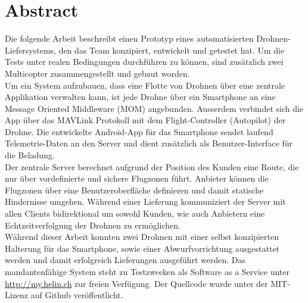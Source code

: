 \newpage
{}
\chapter*{Abstract}

Die folgende Arbeit beschreibt einen Prototyp eines automatisierten Drohnen-Liefersystems, den das Team konzipiert, entwickelt und getestet hat. Um die Tests unter realen Bedingungen durchführen zu können, sind zusätzlich zwei Multicopter zusammengestellt und gebaut worden.\\

Um ein System aufzubauen, dass eine Flotte von Drohnen über eine zentrale Applikation verwalten kann, ist jede Drohne über ein Smartphone an eine Message Oriented Middleware (\Gls{MOM}) angebunden. Ausserdem verbindet sich die App über das \Gls{MAVLink} Protokoll mit dem \Gls{Flight-Controller} (Autopilot) der Drohne. 
Die entwickelte Android-App für das Smartphone sendet laufend Telemetrie-Daten an den Server und dient zusätzlich als Benutzer-Interface für die Beladung. \\

Der zentrale Server berechnet aufgrund der Position des Kunden eine Route, die nur über vordefinierte und sichere Flugzonen führt. Anbieter können die Flugzonen über eine Benutzeroberfläche definieren und damit statische Hindernisse umgehen. Während einer Lieferung kommuniziert der Server mit allen Clients bidirektional um sowohl Kunden, wie auch Anbietern eine Echtzeitverfolgung der Drohnen zu ermöglichen. \\

Während dieser Arbeit konnten zwei Drohnen mit einer selbst konzipierten Halterung für das Smartphone, sowie einer Abwurfvorrichtung ausgestattet werden und damit erfolgreich Lieferungen ausgeführt werden. Das mandantenfähige System steht zu Testzwecken als Software as a Service unter \url{http://my.helin.ch} zur freien Verfügung. Der Quellcode wurde unter der MIT-Lizenz auf Github veröffentlicht.
